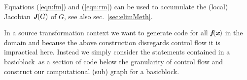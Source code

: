 \documentclass{book}
\newcommand{\basicblock}{basicblock}
\newcommand{\bmf}{\mbox{\bf\em f}}
\newcommand{\bmJ}{\mbox{\bf\em J}}
\newcommand{\bmx}{\mbox{\bf\em x}}
\newcommand{\refsec}[1]{{sec.~\ref{#1}}}
\newcommand{\refeqn}[1]{{(\ref{#1})}}
\begin{document}
Equations \refeqn{eqn:fm} and \refeqn{eqn:rm} can be used to accumulate 
the (local) Jacobian $\bmJ(G)$
of $G$, see also \refsec{sec:elimMeth}. 

In a source transformation context we want to generate code for all $\bmf(\bmx)$
in the domain and because the above construction disregards control flow it is 
impractical here. Instead we simply consider the statements contained in a 
\basicblock\  as a section of code below the granularity of control flow and 
construct our computational (sub) graph for a \basicblock.   

\end{document}
